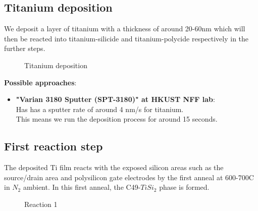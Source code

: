 \subsection{Titanium deposition}

We deposit a layer of titanium with a thickness of around 20-60nm which will then be reacted into titanium-silicide and titanium-polycide respectively in the further steps.

\begin{figure}[H]
	\centering
	\begin{tikzpicture}[node distance = 3cm, auto, thick,scale=\CrossSectionOnly, every node/.style={transform shape}]
		
	\end{tikzpicture}
	\drawStepArrow{}
	\begin{tikzpicture}[node distance = 3cm, auto, thick,scale=\CrossSectionOnly, every node/.style={transform shape}]
		
	\end{tikzpicture}
	\caption{Titanium deposition}
\end{figure}

\textbf{Possible approaches}:
\begin{itemize}
	\item\textbf{"Varian 3180 Sputter (SPT-3180)" at HKUST NFF lab}:\\
	Has has a sputter rate of around 4 nm/s for titanium. \\
	This means we run the deposition process for around 15 seconds.
\end{itemize}

\newpage

\subsection{First reaction step}

The deposited Ti film reacts with the exposed silicon areas such as the source/drain area and polysilicon gate electrodes by the first anneal at 600-700\degree C in $N_2$ ambient.
In this first anneal, the C49-$TiSi_2$ phase is formed.

\begin{figure}[H]
	\centering
	\begin{tikzpicture}[node distance = 3cm, auto, thick,scale=\CrossSectionOnly, every node/.style={transform shape}]
		
	\end{tikzpicture}
	\drawStepArrow{}
	\begin{tikzpicture}[node distance = 3cm, auto, thick,scale=\CrossSectionOnly, every node/.style={transform shape}]
		
	\end{tikzpicture}
	\caption{Reaction 1}
\end{figure}

